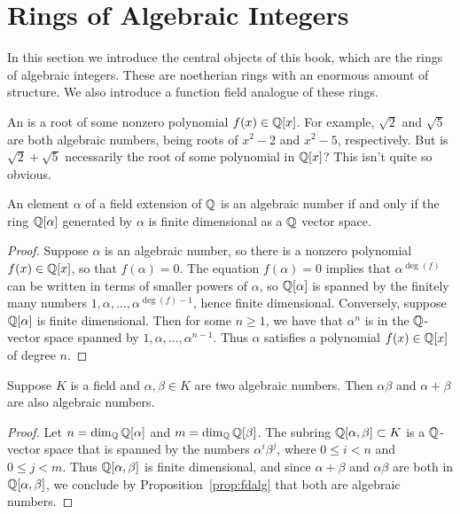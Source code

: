 \section{Rings of Algebraic Integers}

In this section we introduce the central objects of this book, which
are the rings of algebraic integers.  These are noetherian rings with
an enormous amount of structure.  We also introduce a function field
analogue of these rings.


An  is a root of some nonzero polynomial $f(x) \in \mathbb{Q}[x]$.
For example, $\sqrt{2}$ and $\sqrt{5}$ are both algebraic numbers, being
roots of $x^2-2$ and $x^2-5$, respectively.
But is $\sqrt{2} + \sqrt{5}$ necessarily the root of some polynomial in $\mathbb{Q}[x]$?
This isn't quite so obvious.

\begin{proposition}\label{prop:fdalg}
	An element $\alpha$ of a field extension of $\mathbb{Q}$ is an
	algebraic number if and only if the ring $\mathbb{Q}[\alpha]$
	generated by $\alpha$ is finite dimensional as a $\mathbb{Q}$ vector
	space.
\end{proposition}
\begin{proof}
	Suppose $\alpha$ is an algebraic number, so there is a nonzero
	polynomial $f(x)\in\mathbb{Q}[x]$, so that $f(\alpha)=0$. The equation
	$f(\alpha)=0$ implies that $\alpha^{\deg(f)}$ can be written in
	terms of smaller powers of $\alpha$, so $\mathbb{Q}[\alpha]$ is spanned
	by the finitely many numbers $1,\alpha,\ldots,\alpha^{\deg(f)-1}$,
	hence finite dimensional. Conversely, suppose $\mathbb{Q}[\alpha]$ is finite
	dimensional.  Then for some $n\geq 1$, we have that $\alpha^n$ is in
	the $\mathbb{Q}$-vector space spanned by $1,\alpha,\ldots, \alpha^{n-1}$.
	Thus $\alpha$ satisfies a polynomial $f(x) \in \mathbb{Q}[x]$ of degree $n$.
\end{proof}

\begin{proposition}\label{prop:algnumfield}
	Suppose $K$ is a field and $\alpha, \beta\in K$ are two
	algebraic numbers. Then $\alpha\beta$ and $\alpha+\beta$
	are also algebraic numbers.
\end{proposition}
\begin{proof}
	Let $n = \dim_{\mathbb{Q}} \mathbb{Q}[\alpha]$ and $m = \dim_{\mathbb{Q}} \mathbb{Q}[\beta]$.
	The subring $\mathbb{Q}[\alpha,\beta]\subset K$ is a
	$\mathbb{Q}$-vector space that is spanned by the numbers $\alpha^i\beta^j$,
	where $0\leq i<n$ and $0\leq j<m$. Thus
	$\mathbb{Q}[\alpha,\beta]$ is finite dimensional, and since $\alpha+\beta$
	and $\alpha\beta$ are both in $\mathbb{Q}[\alpha,\beta]$, we conclude by Proposition~\ref{prop:fdalg} that both are algebraic numbers.
\end{proof}

